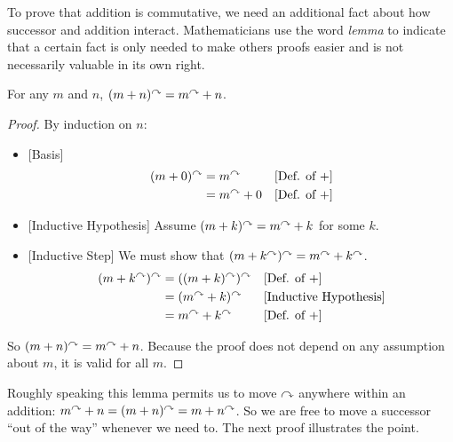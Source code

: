 \ipadbreak

To prove that addition is commutative, we need an additional fact
about how successor and addition interact. 
Mathematicians use the word \emph{lemma} to indicate that a certain fact is only needed to make others proofs easier and is not necessarily valuable in its own right.

\printbreak

\begin{lem}\label{lem:AddSucc}
  For any $m$ and $n$, $(m + n)^\curvearrowright = m^\curvearrowright + n$.

 \begin{proof}
   By induction on $n$:
   \begin{itemize}
   \item{}[Basis]
     \begin{align*}
       (m + 0)^\curvearrowright &= m^\curvearrowright     &&\text{[Def. of $+$]}\\
       &= m^\curvearrowright + 0 &&\text{[Def. of $+$]}
     \end{align*}
   \item{}[Inductive Hypothesis]
    Assume $(m + k)^\curvearrowright = m^\curvearrowright + k$ for some $k$.
   \item{}[Inductive Step]
    We must show that $(m + k^\curvearrowright)^\curvearrowright = m^\curvearrowright + k^\curvearrowright$.
    \begin{align*}
      (m + k^\curvearrowright)^\curvearrowright &= ((m + k)^\curvearrowright)^\curvearrowright && \text{[Def. of $+$]}\\
                     &= (m^\curvearrowright + k)^\curvearrowright &&\text{[Inductive Hypothesis]}\\
                     &= m^\curvearrowright + k^\curvearrowright   &&\text{[Def. of $+$]}
    \end{align*}
   \end{itemize}
So $(m + n)^\curvearrowright = m^\curvearrowright + n$. Because the proof does not depend on any assumption about $m$, it is valid
for all $m$.
 \end{proof}
\end{lem}

Roughly speaking this lemma permits us to move $\curvearrowright$ anywhere within an addition: $m^\curvearrowright + n = (m+n)^\curvearrowright = m+n^\curvearrowright$. So we are free to move a successor ``out of the way'' whenever we need to. The next proof illustrates the point.

\printbreak

